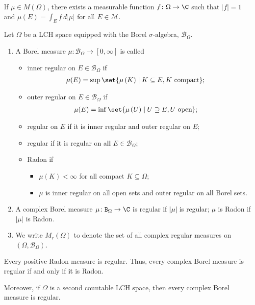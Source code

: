 \begin{fact}
  If $\mu\in M\left(\Omega\right)$, there exists a measurable function $f\colon \Omega\rightarrow \C$ such that $\left\vert f \right\vert = 1$ and $\mu\left(E\right) = \int_{E}^{} f\:d\left\vert \mu \right\vert$ for all $E\in \mathcal{M}$.
\end{fact}
\begin{definition}
  Let $\Omega$ be a LCH space equipped with the Borel $\sigma$-algebra, $\mathcal{B}_{\Omega}$.
  \begin{enumerate}[(1)]
    \item A Borel measure $\mu\colon \mathcal{B}_{\Omega}\rightarrow [0,\infty]$ is called
      \begin{itemize}
        \item inner regular on $E\in \mathcal{B}_{\Omega}$ if
          \begin{align*}
            \mu(E) &= \sup\set{\mu\left(K\right)\mid K\subseteq E, K\text{ compact}};
          \end{align*}
        \item outer regular on $E\in \mathcal{B}_{\Omega}$ if
          \begin{align*}
            \mu(E) &= \inf\set{\mu\left(U\right)\mid U\supseteq E,U\text{ open}};
          \end{align*}
        \item regular on $E$ if it is inner regular and outer regular on $E$;
        \item regular if it is regular on all $E\in \mathcal{B}_{\Omega}$;
        \item Radon if
          \begin{itemize}
            \item $\mu(K) < \infty$ for all compact $K\subseteq \Omega$;
            \item $\mu$ is inner regular on all open sets and outer regular on all Borel sets.
          \end{itemize}
      \end{itemize}
    \item A complex Borel measure $\mu\colon \mathcal{B}_{\Omega}\rightarrow \C$ is regular if $\left\vert \mu \right\vert$ is regular; $\mu$ is Radon if $\left\vert \mu \right\vert$ is Radon.
    \item We write $M_{r}\left(\Omega\right)$ to denote the set of all complex regular measures on $\left(\Omega,\mathcal{B}_{\Omega}\right)$.
  \end{enumerate}
\end{definition}
\begin{fact}
  Every positive Radon measure is regular. Thus, every complex Borel measure is regular if and only if it is Radon.\newline

  Moreover, if $\Omega$ is a second countable LCH space, then every complex Borel measure is regular.
\end{fact}

